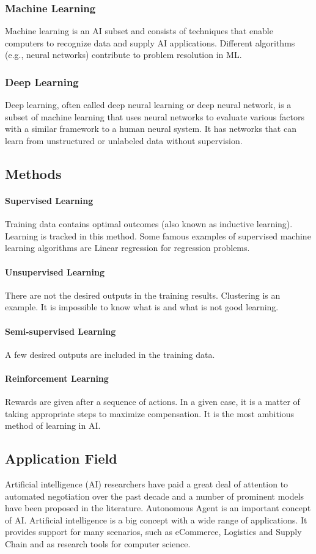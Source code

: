 \subsubsection{Machine Learning} 
Machine learning is an AI subset and consists of techniques that enable computers to recognize data and supply AI applications. Different algorithms (e.g., neural networks) contribute to problem resolution in ML.
\subsubsection{Deep Learning}
Deep learning, often called deep neural learning or deep neural network, is a subset of machine learning that uses neural networks to evaluate various factors with a similar framework to a human neural system. It has networks that can learn from unstructured or unlabeled data without supervision.

\subsection{Methods}
\paragraph{Supervised Learning}
Training data contains optimal outcomes (also known as inductive learning). Learning is tracked in this method. Some famous examples of supervised machine learning algorithms are Linear regression for regression problems. 
\paragraph{Unsupervised Learning} 
There are not the desired outputs in the training results. Clustering is an example. It is impossible to know what is and what is not good learning.
\paragraph{Semi-supervised Learning}
A few desired outputs are included in the training data.
\paragraph{Reinforcement Learning}
Rewards are given after a sequence of actions. In a given case, it is a matter of taking appropriate steps to maximize compensation. It is the most ambitious method of learning in AI.

\subsection{Application Field}
Artificial intelligence (AI) researchers have paid a great deal of attention to automated negotiation over the past decade and a number of prominent models have been proposed in the literature. Autonomous Agent is an important concept of AI.
Artificial intelligence is a big concept with a wide range of applications. It provides support for many scenarios, such as eCommerce, Logistics and Supply Chain and as research tools for computer science.

